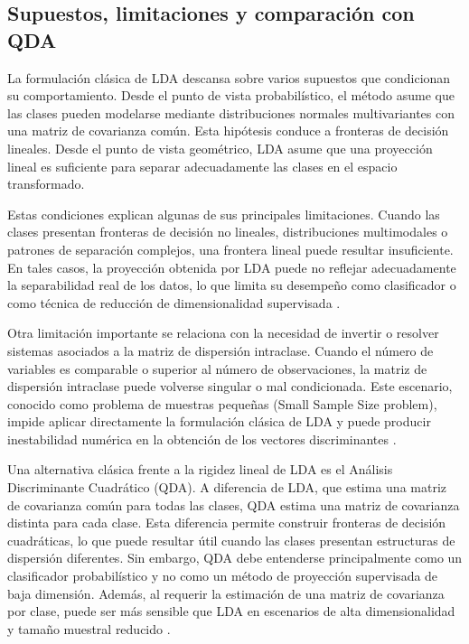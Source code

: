\subsection{Supuestos, limitaciones y comparación con QDA}

La formulación clásica de LDA descansa sobre varios supuestos que condicionan su comportamiento. Desde el punto de vista probabilístico, el método asume que las clases pueden modelarse mediante distribuciones normales multivariantes con una matriz de covarianza común. Esta hipótesis conduce a fronteras de decisión lineales. Desde el punto de vista geométrico, LDA asume que una proyección lineal es suficiente para separar adecuadamente las clases en el espacio transformado.

Estas condiciones explican algunas de sus principales limitaciones. Cuando las clases presentan fronteras de decisión no lineales, distribuciones multimodales o patrones de separación complejos, una frontera lineal puede resultar insuficiente. En tales casos, la proyección obtenida por LDA puede no reflejar adecuadamente la separabilidad real de los datos, lo que limita su desempeño como clasificador o como técnica de reducción de dimensionalidad supervisada \cite{mika1999fisher}.

Otra limitación importante se relaciona con la necesidad de invertir o resolver sistemas asociados a la matriz de dispersión intraclase. Cuando el número de variables es comparable o superior al número de observaciones, la matriz de dispersión intraclase puede volverse singular o mal condicionada. Este escenario, conocido como problema de muestras pequeñas (Small Sample Size problem), impide aplicar directamente la formulación clásica de LDA y puede producir inestabilidad numérica en la obtención de los vectores discriminantes \cite{gao2006direct}.

Una alternativa clásica frente a la rigidez lineal de LDA es el Análisis Discriminante Cuadrático (QDA). A diferencia de LDA, que estima una matriz de covarianza común para todas las clases, QDA estima una matriz de covarianza distinta para cada clase. Esta diferencia permite construir fronteras de decisión cuadráticas, lo que puede resultar útil cuando las clases presentan estructuras de dispersión diferentes. Sin embargo, QDA debe entenderse principalmente como un clasificador probabilístico y no como un método de proyección supervisada de baja dimensión. Además, al requerir la estimación de una matriz de covarianza por clase, puede ser más sensible que LDA en escenarios de alta dimensionalidad y tamaño muestral reducido \cite{duda2000pattern}.

